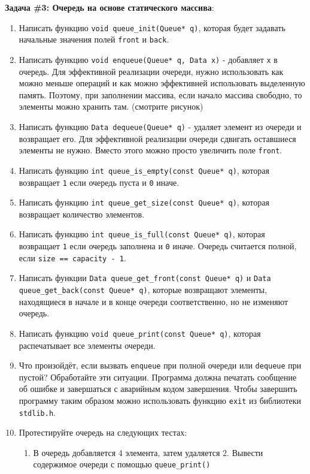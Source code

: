 \documentclass{article}
\begin{document}
\textbf{Задача \#3: Очередь на основе статического массива}:
\begin{enumerate}
\item Написать функцию \texttt{void queue\_init(Queue* q)}, которая будет задавать начальные значения полей \texttt{front} и \texttt{back}.
\item Написать функцию \texttt{void enqueue(Queue* q, Data x)} - добавляет \texttt{x} в очередь. Для эффективной реализации очереди, нужно использовать как можно меньше операций и как можно эффективней использовать выделенную память. Поэтому, при заполнении массива, если начало массива свободно, то элементы можно хранить там. (смотрите рисунок)
\item Написать функцию \texttt{Data dequeue(Queue* q)} - удаляет элемент из очереди и возвращает его. Для  эффективной реализации очереди сдвигать оставшиеся элементы не нужно. Вместо этого можно просто увеличить поле \texttt{front}.
\item Написать функцию \texttt{int queue\_is\_empty(const Queue* q)}, которая возвращает \texttt{1} если очередь пуста и \texttt{0} иначе.
\item Написать функцию \texttt{int queue\_get\_size(const Queue* q)}, которая возвращает количество элементов.
\item Написать функцию \texttt{int queue\_is\_full(const Queue* q)}, которая возвращает \texttt{1} если очередь заполнена и \texttt{0} иначе. Очередь считается полной, если \texttt{size == capacity - 1}.
\item Написать функции \texttt{Data queue\_get\_front(const Queue* q)} и \texttt{Data queue\_get\_back(const Queue* q)}, которые возвращают элементы, находящиеся в начале и в конце очереди соответственно, но не изменяют очередь.
\item Написать функцию \texttt{void queue\_print(const Queue* q)}, которая распечатывает все элементы очереди.
\item Что произойдёт, если вызвать \texttt{enqueue} при полной очереди или \texttt{dequeue} при пустой? Обработайте эти ситуации. Программа должна печатать сообщение об ошибке и завершаться с аварийным кодом завершения. Чтобы завершить программу таким образом можно использовать функцию \texttt{exit} из библиотеки \texttt{stdlib.h}.
\newpage
\item Протестируйте очередь на следующих тестах:
\begin{enumerate}
\item В очередь добавляется 4 элемента, затем удаляется 2. Вывести содержимое очереди с помощью \texttt{queue\_print()}

\end{enumerate}
\end{enumerate}
\end{document}
